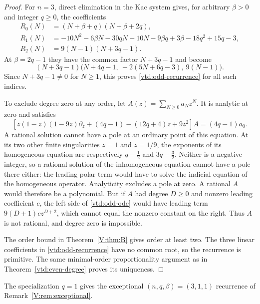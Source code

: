 \documentclass[11pt,a4paper]{article}
\theoremstyle{definition}
\theoremstyle{remark}
\numberwithin{equation}{section}
\begin{document}
\begin{proof}
For $n=3$, direct elimination in the Kac system gives, for arbitrary
$\beta>0$ and integer $q\ge0$, the coefficients
\begin{align*}
 R_0(N)&=(N+\beta+q)(N+\beta+2q),\\
 R_1(N)&=-10N^2-6\beta N-30qN+10N
                -9\beta q+3\beta-18q^2+15q-3,\\
 R_2(N)&=9(N-1)(N+3q-1).
\end{align*}
At $\beta=2q-1$ they have the common factor $N+3q-1$ and become
\[
 (N+3q-1)\bigl(N+4q-1,\ -2(5N+6q-3),\ 9(N-1)\bigr).
\]
Since $N+3q-1\ne0$ for $N\ge1$, this proves
\eqref{vtd:odd-recurrence} for all such indices.

To exclude degree zero at any order, let $A(z)=\sum_{N\ge0}a_Nz^N$.
It is analytic at zero and satisfies
\begin{equation}\label{vtd:odd-ode}
 \left[z(1-z)(1-9z)\partial_z
       +(4q-1)-(12q+4)z+9z^2\right]A
                         =(4q-1)a_0.
\end{equation}
A rational solution cannot have a pole at an ordinary point of this
equation.  At its two other finite singularities $z=1$ and $z=1/9$,
the exponents of its homogeneous equation are respectively
$q-\tfrac12$ and $3q-\tfrac32$.  Neither is a negative integer,
so a rational solution of the inhomogeneous equation cannot have a
pole there either: the leading polar term would have to solve the
indicial equation of the homogeneous operator.  Analyticity excludes
a pole at zero.  A rational $A$ would therefore be a polynomial.
But if $A$ had degree $D\ge0$ and nonzero leading coefficient $c$,
the left side of \eqref{vtd:odd-ode} would have leading term
$9(D+1)c z^{D+2}$, which cannot equal the nonzero constant on the
right.  Thus $A$ is not rational, and degree zero is impossible.

The order bound in Theorem~\ref{V:thm:B} gives order at least two.
The three linear coefficients in \eqref{vtd:odd-recurrence} have
no common root, so the recurrence is primitive.  The same
minimal-order proportionality argument as in
Theorem~\ref{vtd:even-degree} proves its uniqueness.
\end{proof}

The specialization $q=1$ gives the exceptional $(n,q,\beta)=(3,1,1)$ recurrence of Remark~\ref{V:rem:exceptional}.
\end{document}
